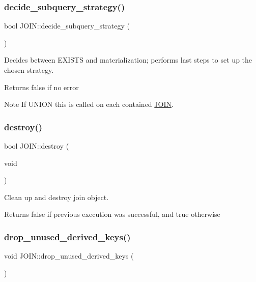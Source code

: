 \subsubsection{\texorpdfstring{decide\+\_\+subquery\+\_\+strategy()}{decide\_subquery\_strategy()}}
{\footnotesize\ttfamily bool J\+O\+I\+N\+::decide\+\_\+subquery\+\_\+strategy (\begin{DoxyParamCaption}{ }\end{DoxyParamCaption})}

Decides between E\+X\+I\+S\+TS and materialization; performs last steps to set up the chosen strategy. \begin{DoxyReturn}{Returns}
\textquotesingle{}false\textquotesingle{} if no error
\end{DoxyReturn}
\begin{DoxyNote}{Note}
If U\+N\+I\+ON this is called on each contained \mbox{\hyperlink{classJOIN}{J\+O\+IN}}. 
\end{DoxyNote}
\mbox{\label{group__Query__Optimizer_gaf2d76654da99be4012095c016ea5d4d2}} 
\subsubsection{\texorpdfstring{destroy()}{destroy()}}
{\footnotesize\ttfamily bool J\+O\+I\+N\+::destroy (\begin{DoxyParamCaption}\item[{void}]{ }\end{DoxyParamCaption})}

Clean up and destroy join object.

\begin{DoxyReturn}{Returns}
false if previous execution was successful, and true otherwise 
\end{DoxyReturn}
\mbox{\label{group__Query__Optimizer_ga54392f4f40ec2c57b8263f22fa3d4296}} 
\subsubsection{\texorpdfstring{drop\+\_\+unused\+\_\+derived\+\_\+keys()}{drop\_unused\_derived\_keys()}}
{\footnotesize\ttfamily void J\+O\+I\+N\+::drop\+\_\+unused\+\_\+derived\+\_\+keys (\begin{DoxyParamCaption}{ }\end{DoxyParamCaption})}



